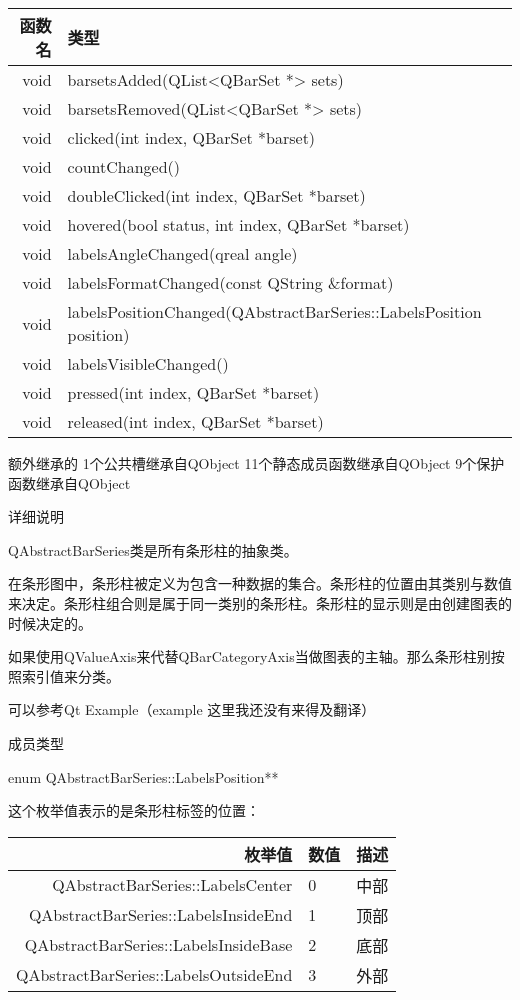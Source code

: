 \begin{tabular}{|r|l|}
\hline
函数名 & 类型 \\
\hline
void&	barsetsAdded(QList<QBarSet *> sets)\\
\hline
void&	barsetsRemoved(QList<QBarSet *> sets)\\
\hline
void&	clicked(int index, QBarSet *barset)\\
\hline
void&	countChanged()\\
\hline
void&	doubleClicked(int index, QBarSet *barset)\\
\hline
void&	hovered(bool status, int index, QBarSet *barset)\\
\hline
void&	labelsAngleChanged(qreal angle)\\
\hline
void&	labelsFormatChanged(const QString \&format)\\
\hline
void&	labelsPositionChanged(QAbstractBarSeries::LabelsPosition position)\\
\hline
void&	labelsVisibleChanged()\\
\hline
void&	pressed(int index, QBarSet *barset)\\
\hline
void&	released(int index, QBarSet *barset)\\
\hline
\end{tabular}

\splitLine

额外继承的
1个公共槽继承自QObject 11个静态成员函数继承自QObject 9个保护函数继承自QObject

\splitLine

详细说明

QAbstractBarSeries类是所有条形柱的抽象类。

在条形图中，条形柱被定义为包含一种数据的集合。条形柱的位置由其类别与数值来决定。条形柱组合则是属于同一类别的条形柱。条形柱的显示则是由创建图表的时候决定的。

如果使用QValueAxis来代替QBarCategoryAxis当做图表的主轴。那么条形柱别按照索引值来分类。

可以参考Qt Example（example 这里我还没有来得及翻译）

\splitLine

成员类型

enum QAbstractBarSeries::LabelsPosition**

这个枚举值表示的是条形柱标签的位置：

\begin{tabular}{|r|l|c|}
\hline
枚举值 & 数值 & 描述\\
\hline
QAbstractBarSeries::LabelsCenter&	0&	中部\\
\hline
QAbstractBarSeries::LabelsInsideEnd&	1&	顶部\\
\hline
QAbstractBarSeries::LabelsInsideBase&	2&	底部\\
\hline
QAbstractBarSeries::LabelsOutsideEnd&	3&	外部\\
\hline
\end{tabular}


